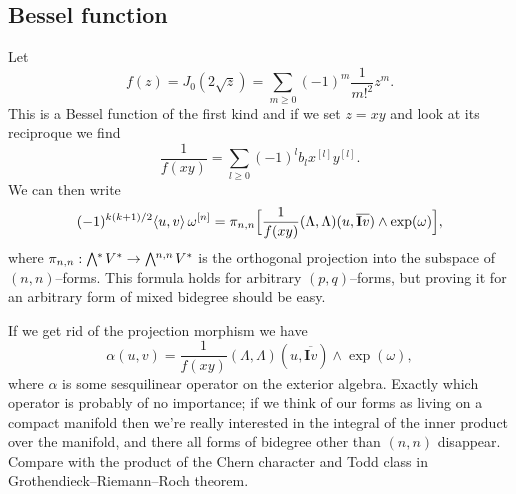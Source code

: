 \documentclass[11pt,a4paper]{amsart}
\def\^#1{^{[#1]}}
\def\bw#1{\bigwedge{}^{\mkern-5mu #1}\mkern2mu}
\def\I{\mathbf{I}}
\def\la{\langle}
\def\ra{\rangle}
\theoremstyle{definition}
\theoremstyle{remark}
\numberwithin{equation}{section}
\begin{document}
\subsection*{Bessel function}

Let 
$$
f(z) = J_0(2\sqrt z) = \sum_{m\geq0} (-1)^m \frac{1}{m!^2} z^m.
$$
This is a Bessel function of the first kind and if we set $z = xy$ and look at its reciproque we find
$$
\frac{1}{f(xy)} = \sum_{l\geq 0} (-1)^l b_l x\^l y\^l.
$$
We can then write
$$
(-1)^{k(k+1)/2}
\la u,v \ra \, \omega\^n
= 
\pi_{n,n}\Bigl[
\frac{1}{f(xy)}(\Lambda,\Lambda)(u,\overline{\I v})
\wedge \exp(\omega)
\Bigr],
$$
where $\pi_{n,n} : \bw{*} V^* \to \bw{n,n} V^*$ is the orthogonal
projection into the subspace of $(n,n)$--forms. This formula holds for
arbitrary $(p,q)$--forms, but proving it for an arbitrary form of
mixed bidegree should be easy.

If we get rid of the projection morphism we have
$$
\alpha(u,v)
= 
\frac{1}{f(xy)}(\Lambda,\Lambda)(u,\overline{\I v})
\wedge \exp(\omega),
$$
where $\alpha$ is some sesquilinear operator on the exterior algebra. 
Exactly which operator is probably of no importance; if we think of our
forms as living on a compact manifold then we're really interested in
the integral of the inner product over the manifold, and there all forms
of bidegree other than $(n,n)$ disappear. Compare with the product of
the Chern character and Todd class in Grothendieck--Riemann--Roch theorem.




\end{document}
